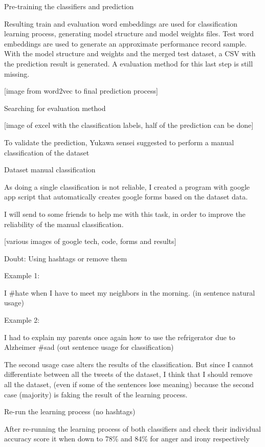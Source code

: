 Pre-training the classifiers and prediction

Resulting train and evaluation word embeddings are used for classification learning process, generating model structure and model weights files.
Test word embeddings are used to generate an approximate performance record sample.
With the model structure and weights and the merged test dataset, a CSV with the prediction result is generated.
A evaluation method for this last step is still missing.

[image from word2vec to final prediction process]

Searching for evaluation method

[image of excel with the classification labels, half of the prediction can be done]

To validate the prediction, Yukawa sensei suggested to perform a manual classification of the dataset

Dataset manual classification

As doing a single classification is not reliable, I created a program with google app script that automatically creates google forms based on the dataset data.

I will send to some friends to help me with this task, in order to improve the reliability of the manual classification.

[various images of google tech, code, forms and results]

Doubt: Using hashtags or remove them

Example 1:

I \#hate when I have to meet my neighbors in the morning. (in sentence natural usage)

Example 2:

I had to explain my parents once again how to use the refrigerator due to Alzheimer \#sad 
(out sentence usage for classification)

The second usage case alters the results of the classification. But since I cannot differentiate between all the tweets of the dataset, I think that I should remove all the dataset, (even if some of the sentences lose meaning) because the second case (majority) is faking the result of the learning process. 

Re-run the learning process (no hashtags)

After re-running the learning process of both classifiers and check their individual accuracy score it when down to 78\% and 84\% for anger and irony respectively

